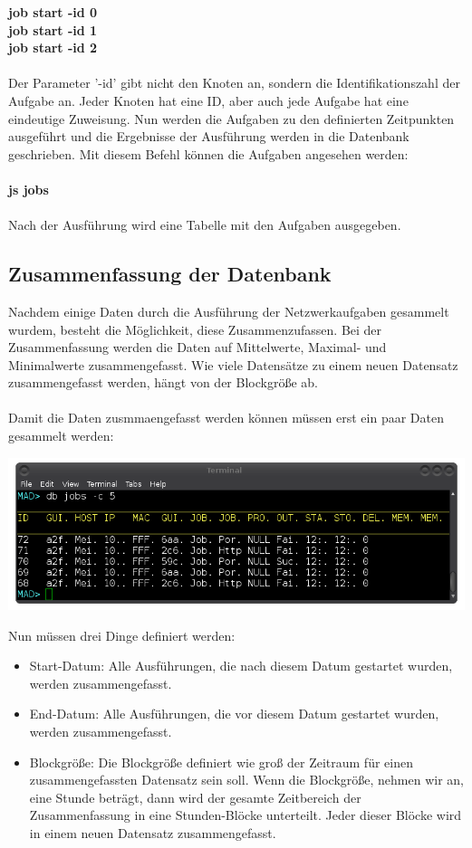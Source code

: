 \documentclass[12pt,a4paper]{report}
\begin{document}
\begin{onehalfspace}
\textbf{job start -id 0}\\
\textbf{job start -id 1}\\
\textbf{job start -id 2}\\\\
Der Parameter '-id' gibt nicht den Knoten an, sondern die Identifikationszahl der Aufgabe an. Jeder Knoten hat eine ID, aber auch jede Aufgabe hat eine eindeutige Zuweisung. Nun werden die Aufgaben zu den definierten Zeitpunkten ausgeführt und die Ergebnisse der Ausführung werden in die Datenbank geschrieben. Mit diesem Befehl können die Aufgaben angesehen werden: \\\\
\textbf{js jobs}\\\\
Nach der Ausführung wird eine Tabelle mit den Aufgaben ausgegeben.

\subsection{Zusammenfassung der Datenbank}

Nachdem einige Daten durch die Ausführung der Netzwerkaufgaben gesammelt wurdem, besteht die Möglichkeit, diese Zusammenzufassen. Bei der Zusammenfassung werden die Daten auf Mittelwerte, Maximal- und Minimalwerte zusammengefasst. Wie viele Datensätze zu einem neuen Datensatz zusammengefasst werden, hängt von der Blockgröße ab.\\\\
Damit die Daten zusmmaengefasst werden können müssen erst ein paar Daten gesammelt werden:

\begin{center}
\includegraphics[scale=0.6]{img/db_jobs2.png}
\end{center}

Nun müssen drei Dinge definiert werden:

\begin{itemize}
\item Start-Datum: Alle Ausführungen, die nach diesem Datum gestartet wurden, werden zusammengefasst.
\item End-Datum: Alle Ausführungen, die vor diesem Datum gestartet wurden, werden zusammengefasst.
\item Blockgröße: Die Blockgröße definiert wie groß der Zeitraum für einen zusammengefassten Datensatz sein soll. Wenn die Blockgröße, nehmen wir an, eine Stunde beträgt, dann wird der gesamte Zeitbereich der Zusammenfassung in eine Stunden-Blöcke unterteilt. Jeder dieser Blöcke wird in einem neuen Datensatz zusammengefasst.
\end{itemize}


\end{onehalfspace}
\end{document}
